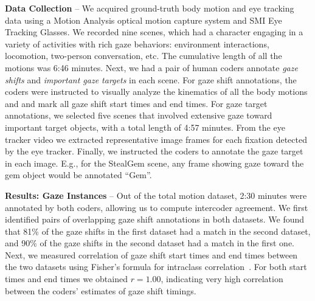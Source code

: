 \noindent\textbf{Data Collection} -- We acquired ground-truth body motion and eye tracking data using a Motion Analysis optical motion capture system and SMI Eye Tracking Glasses. We recorded nine scenes, which had a character engaging in a variety of activities with rich gaze behaviors: environment interactions, locomotion, two-person conversation, etc. The cumulative length of all the motions was 6:46 minutes. Next, we had a pair of human coders annotate \emph{gaze shifts} and \emph{important gaze targets} in each scene. For gaze shift annotations, the coders were instructed to visually analyze the kinematics of all the body motions and and mark all gaze shift start times and end times. For gaze target annotations, we selected five scenes that involved extensive gaze toward important target objects, with a total length of 4:57 minutes. From the eye tracker video we extracted representative image frames for each fixation detected by the eye tracker. Finally, we instructed the coders to annotate the gaze target in each image. E.g., for the StealGem scene, any frame showing gaze toward the gem object would be annotated ``Gem''.

\noindent\textbf{Results: Gaze Instances} -- Out of the total motion dataset, 2:30 minutes were annotated by both coders, allowing us to compute intercoder agreement. We first identified pairs of overlapping gaze shift annotations in both datasets. We found that 81\% of the gaze shifts in the first dataset had a match in the second dataset, and 90\% of the gaze shifts in the second dataset had a match in the first one. Next, we measured correlation of gaze shift start times and end times between the two datasets using Fisher's formula for intraclass correlation~\cite{fisher1925statistical}. For both start times and end times we obtained $r = 1.00$, indicating very high correlation between the coders' estimates of gaze shift timings.

